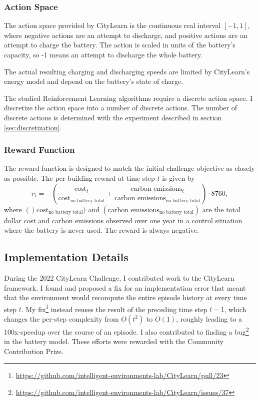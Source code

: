 \subsubsection{Action Space}
The action space provided by CityLearn is the continuous real interval $[-1,1]$, where negative actions are an attempt to discharge, and positive actions are an attempt to charge the battery.
The action is scaled in units of the battery's capacity, so -1 means an attempt to discharge the whole battery.

The actual resulting charging and discharging speeds are limited by CityLearn's energy model and depend on the battery's state of charge.

The studied Reinforcement Learning algorithms require a discrete action space.
I discretize the action space into a number of discrete actions. The number of discrete actions is determined with the experiment described in section \ref{sec:discretization}.

\subsubsection{Reward Function}
The reward function is designed to match the initial challenge objective as closely as possible.
The per-building reward at time step $t$ is given by
$$r_t = - \left(\frac{\text{cost}_t}{\text{cost}_\text{no battery total}}
    + \frac{\text{carbon emissions}_t}{\text{carbon emissions}_\text{no battery total}}\right) \cdot 8760,$$
where $()\text{cost}_\text{no battery total})$ and $(\text{carbon emissions}_\text{no battery total})$ are the total dollar cost and carbon emissions observed over one year in a control situation where the battery is never used.
The reward is always negative.

\subsection{Implementation Details}
During the 2022 CityLearn Challenge, I contributed work to the CityLearn framework.
I found and proposed a fix for an implementation error that meant that the environment would recompute the entire episode history at every time step $t$.
My fix\footnote{\url{https://github.com/intelligent-environments-lab/CityLearn/pull/23}} instead reuses the result of the preceding time step $t-1$, which changes the per-step complexity from $O(t^2)$ to $O(1)$, roughly leading to a 100x-speedup over the course of an episode.
I also contributed to finding a bug\footnote{\url{https://github.com/intelligent-environments-lab/CityLearn/issues/37}} in the battery model.
These efforts were rewarded with the Community Contribution Prize.

